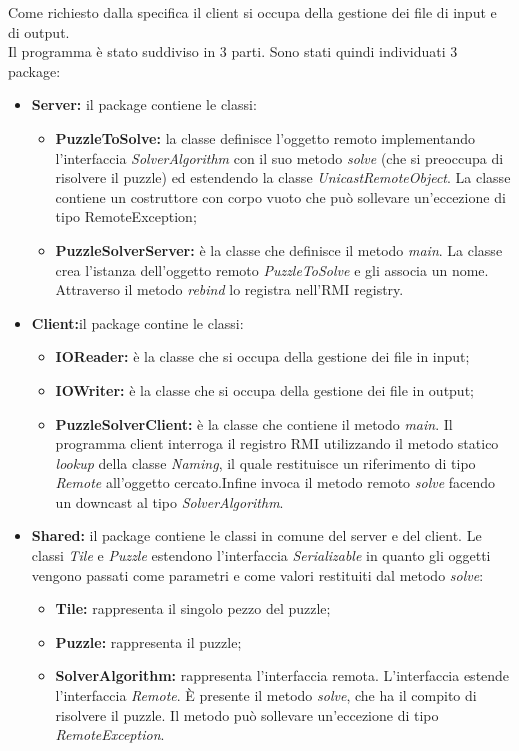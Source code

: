\documentclass[13pt]{article}
\begin{document}
Come richiesto dalla specifica il client si occupa della gestione dei file di input e di output.\\
Il programma è stato suddiviso in 3 parti. Sono stati quindi individuati 3 package:
\begin{itemize}
	\item \textbf{Server: }il package contiene le classi:
		\begin{itemize}
			\item \textbf{PuzzleToSolve:} la classe definisce l'oggetto remoto implementando l'interfaccia \textit{SolverAlgorithm} con il suo metodo \textit{solve} (che si preoccupa di risolvere il puzzle)  ed estendendo la classe \textit{UnicastRemoteObject}. La classe contiene un costruttore con corpo vuoto che può sollevare un'eccezione di tipo RemoteException;
			\item \textbf{PuzzleSolverServer: }è la classe che definisce il metodo \textit{main}. La classe crea l'istanza dell'oggetto remoto \textit{PuzzleToSolve} e gli associa un nome. Attraverso il metodo \textit{rebind} lo registra nell'RMI registry.
		\end{itemize}
	\item \textbf{Client:}il package contine le classi:
		\begin{itemize}
			\item \textbf{IOReader: }è la classe che si occupa della gestione dei file in input;
			\item \textbf{IOWriter: }è la classe che si occupa della gestione dei file in output;
			\item \textbf{PuzzleSolverClient: }è la classe che contiene il metodo \textit{main}. Il programma client interroga il registro RMI utilizzando il metodo statico \textit{lookup} della classe \textit{Naming}, il quale restituisce un riferimento di tipo \textit{Remote} all'oggetto cercato.Infine invoca il metodo remoto \textit{solve} facendo un downcast al tipo \textit{SolverAlgorithm}.
		\end{itemize}
	\item \textbf{Shared:} il package contiene le classi in comune del server e del client. Le classi \textit{Tile} e \textit{Puzzle} estendono l'interfaccia \textit{Serializable} in quanto gli oggetti vengono passati come parametri e come valori restituiti dal metodo \textit{solve}:
		\begin{itemize}
			\item \textbf{Tile:} rappresenta il singolo pezzo del puzzle;
			\item \textbf{Puzzle:} rappresenta il puzzle;
			\item \textbf{SolverAlgorithm:} rappresenta l'interfaccia remota. L'interfaccia estende l'interfaccia \textit{Remote}. È presente il metodo \textit{solve}, che ha il compito di risolvere il puzzle. Il metodo può sollevare un'eccezione di tipo \textit{RemoteException}.
		\end{itemize}
\end{itemize}
\end{document}
